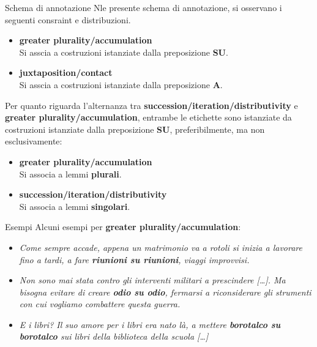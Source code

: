 \documentclass{beamer}
\begin{document}
\begin{frame}{Schema di annotazione}
Nle presente schema di annotazione, si osservano i seguenti consraint e distribuzioni.
    
    \begin{itemize}
        \item \textbf{greater plurality/accumulation} \\
        Si asscia a costruzioni istanziate dalla preposizione \textbf{SU}.
        \item \textbf{juxtaposition/contact} \\
        Si asscia a costruzioni istanziate dalla preposizione \textbf{A}.
    \end{itemize}

Per quanto riguarda l'alternanza tra \textbf{succession/iteration/distributivity} e \textbf{greater plurality/accumulation}, entrambe le etichette sono istanziate da costruzioni istanziate dalla preposizione \textbf{SU}, preferibilmente, ma non esclusivamente:

    \begin{itemize}
        \item \textbf{greater plurality/accumulation} \\
        Si associa a lemmi \textbf{plurali}.
        \item \textbf{succession/iteration/distributivity}  \\
         Si associa a lemmi \textbf{singolari}.
    \end{itemize}
\end{frame}

\begin{frame}{Esempi}
    Alcuni esempi per \textbf{greater plurality/accumulation}:
    
    \begin{itemize}
        \item \textit{Come sempre accade, appena un matrimonio va a rotoli si inizia a lavorare fino a tardi, a fare \textbf{riunioni su riunioni}, viaggi improvvisi.}
        \item \textit{Non sono mai stata contro gli interventi militari a prescindere […]. Ma bisogna evitare di creare \textbf{odio su odio}, fermarsi a riconsiderare gli strumenti con cui vogliamo combattere questa guerra.}
        \item \textit{E i libri? Il suo amore per i libri era nato là, a mettere \textbf{borotalco su borotalco} sui libri della biblioteca della scuola […]}
    \end{itemize}
\end{frame}
\end{document}
